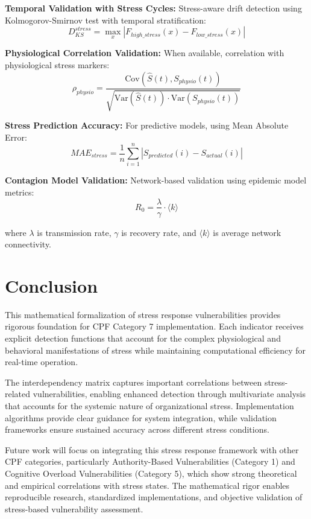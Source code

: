 \documentclass[11pt,a4paper]{article}
\begin{document}
\textbf{Temporal Validation with Stress Cycles:}
Stress-aware drift detection using Kolmogorov-Smirnov test with temporal stratification:
\begin{equation}
D_{KS}^{stress} = \max_x |F_{high\_stress}(x) - F_{low\_stress}(x)|
\end{equation}

\textbf{Physiological Correlation Validation:}
When available, correlation with physiological stress markers:
\begin{equation}
\rho_{physio} = \frac{\text{Cov}(\hat{S}(t), S_{physio}(t))}{\sqrt{\text{Var}(\hat{S}(t)) \cdot \text{Var}(S_{physio}(t))}}
\end{equation}

\textbf{Stress Prediction Accuracy:}
For predictive models, using Mean Absolute Error:
\begin{equation}
MAE_{stress} = \frac{1}{n} \sum_{i=1}^{n} |S_{predicted}(i) - S_{actual}(i)|
\end{equation}

\textbf{Contagion Model Validation:}
Network-based validation using epidemic model metrics:
\begin{equation}
R_0 = \frac{\lambda}{\gamma} \cdot \langle k \rangle
\end{equation}

where $\lambda$ is transmission rate, $\gamma$ is recovery rate, and $\langle k \rangle$ is average network connectivity.

\section{Conclusion}

This mathematical formalization of stress response vulnerabilities provides rigorous foundation for CPF Category 7 implementation. Each indicator receives explicit detection functions that account for the complex physiological and behavioral manifestations of stress while maintaining computational efficiency for real-time operation.

The interdependency matrix captures important correlations between stress-related vulnerabilities, enabling enhanced detection through multivariate analysis that accounts for the systemic nature of organizational stress. Implementation algorithms provide clear guidance for system integration, while validation frameworks ensure sustained accuracy across different stress conditions.

Future work will focus on integrating this stress response framework with other CPF categories, particularly Authority-Based Vulnerabilities (Category 1) and Cognitive Overload Vulnerabilities (Category 5), which show strong theoretical and empirical correlations with stress states. The mathematical rigor enables reproducible research, standardized implementations, and objective validation of stress-based vulnerability assessment.
\end{document}
